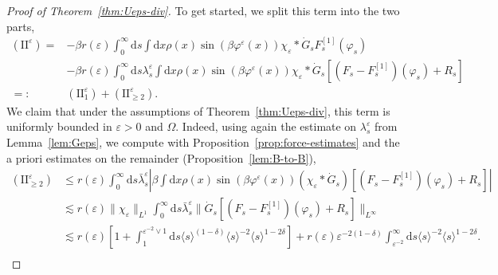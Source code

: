 \documentclass[11pt, a4paper]{scrartcl}
\numberwithin{equation}{section}
\theoremstyle{plain}
\theoremstyle{remark}
\newcommand{\Iota}{\mathrm{I}}
\newcommand{\backassign}{=:}
\newcommand{\mathd}{\mathrm{d}}
\newcommand{\tmtextbf}[1]{\text{{\bfseries{#1}}}}
\begin{document}
\begin{proof}[Proof of Theorem~\ref{thm:Ueps-div}]
	\tmtextbf{$(\Iota \Iota^{\varepsilon})$} To get started, we split this term
	into the two parts,
	\[ \begin{aligned}
			(\Iota \Iota^{\varepsilon}) = & - \beta r (\varepsilon)
			\int_0^{\infty} \mathd s \int \mathd x \rho (x) \sin (\beta
			\varphi^{\varepsilon} (x)) \chi_{\varepsilon} \ast \dot{G}_s F_s^{[1]}
			(\varphi_s)                                                                      \\
			                              & - \beta r (\varepsilon) \int_0^{\infty} \mathd s
			\lambda_s^{\varepsilon} \int \mathd x \rho (x) \sin (\beta
			\varphi^{\varepsilon} (x)) \chi_{\varepsilon} \ast \dot{G}_s [(F_s  -
			F_s^{[1]}) (\varphi_s) + R_s]                                                    \\
			\backassign                   & (\Iota \Iota^{\varepsilon}_1) + (\Iota
			\Iota_{\geqslant 2}^{\varepsilon}) .
		\end{aligned} \]
	\tmtextbf{$(\Iota \Iota^{\varepsilon}_{\geqslant 2})$} We claim that under
	the assumptions of Theorem~\ref{thm:Ueps-div}, this term is uniformly
	bounded in $\varepsilon > 0$ and $\Omega$. Indeed, using again the estimate
	on $\lambda^{\varepsilon}_s$ from Lemma~\ref{lem:Geps}, we compute with
	Proposition~\ref{prop:force-estimates} and the a priori estimates on the
	remainder (Proposition~\ref{lem:B-to-B}),
	\[ \begin{aligned}
			(\Iota \Iota_{\geqslant 2}^{\varepsilon}) & \leqslant  r (\varepsilon)
			\int_0^{\infty} \mathd s \bar{\lambda}_s^{\varepsilon} \left| \beta \int
			\mathd x \rho (x) \sin (\beta \varphi^{\varepsilon} (x))
			(\chi_{\varepsilon} \ast \dot{G}_s) [(F_s  - F_s^{[1]}) (\varphi_s) +
			R_s] \right|                                                                                                    \\
			                                          & \lesssim  r (\varepsilon) \| \chi_{\varepsilon} \|_{L^1}
			\int_0^{\infty} \mathd s \bar{\lambda}_s^{\varepsilon} \| \dot{G}_s [(F_s  -
			F_s^{[1]}) (\varphi_s) + R_s] \|_{L^{\infty}}                                                                   \\
			                                          & \lesssim  r (\varepsilon) \left[ 1 + \int_1^{\varepsilon^{- 2} \vee
					1} \mathd s \langle s \rangle^{(1 - \delta)} \langle s \rangle^{- 2}
				\langle s \rangle^{1 - 2 \delta} \right] + r (\varepsilon)
			\varepsilon^{- 2 (1 - \delta)} \int_{\varepsilon^{- 2}}^{\infty} \mathd
			s \langle s \rangle^{- 2} \langle s \rangle^{1 - 2 \delta} .                                                    \\

\end{aligned}\]
\end{proof}
\end{document}
